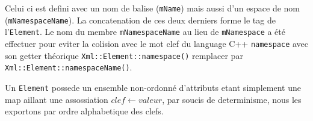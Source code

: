         Celui ci est defini avec un nom de balise (\lstinline$mName$) mais aussi d'un espace de nom (\lstinline$mNamespaceName$). La concatenation de ces deux derniers forme le tag de l'\lstinline$Element$. Le nom du membre \lstinline$mNamespaceName$ au lieu de \lstinline$mNamespace$ a \'et\'e effectuer pour eviter la colision avec le mot clef du language C++ \lstinline$namespace$ avec son getter th\'eorique \lstinline$Xml::Element::namespace()$ remplacer par \lstinline$Xml::Element::namespaceName()$.

        Un \lstinline$Element$ possede un ensemble non-ordonné d'attributs etant simplement une map aillant une assossiation $clef \leftarrow valeur$, par soucis de determinisme, nous les exportons par ordre alphabetique des clefs.
